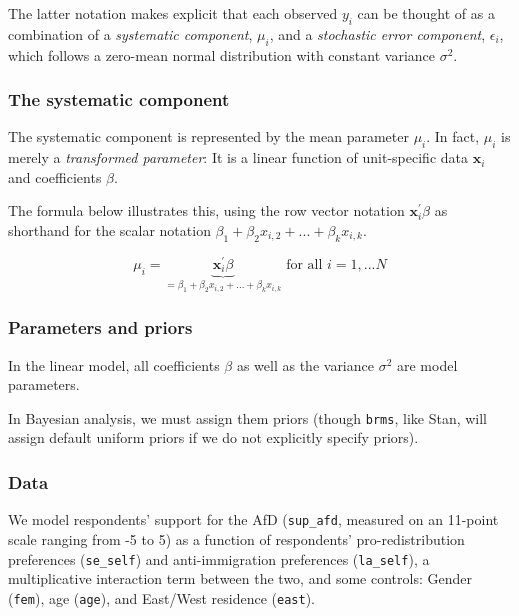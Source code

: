 \documentclass[
  11pt,
]{article}
\begin{document}
The latter notation makes explicit that each observed \(y_i\) can be thought of as a combination of a \emph{systematic component}, \(\mu_i\), and a \emph{stochastic error component}, \(\epsilon_i\), which follows a zero-mean normal distribution with constant variance \(\sigma^2\).

\hypertarget{the-systematic-component}{%
\subsubsection{The systematic component}\label{the-systematic-component}}

The systematic component is represented by the mean parameter \(\mu_i\). In fact, \(\mu_i\) is merely a \emph{transformed parameter}: It is a linear function of unit-specific data \(\mathbf{x}_i\) and coefficients \(\beta\).

The formula below illustrates this, using the row vector notation \(\mathbf{x}_i^{\prime} \beta\) as shorthand for the scalar notation \(\beta_1 + \beta_2 x_{i, 2} + ...+\beta_k x_{i,k}\).

\[\mu_i = \underbrace{\mathbf{x}_i^{\prime} \beta}_{= \beta_1 + \beta_2 x_{i, 2} + ...+\beta_k x_{i,k}}  \text{ for all }i = 1,...N\]

\hypertarget{parameters-and-priors}{%
\subsubsection{Parameters and priors}\label{parameters-and-priors}}

In the linear model, all coefficients \(\beta\) as well as the variance \(\sigma^2\) are model parameters.

In Bayesian analysis, we must assign them priors (though \texttt{brms}, like Stan, will assign default uniform priors if we do not explicitly specify priors).

\hypertarget{data}{%
\subsubsection{Data}\label{data}}

We model respondents' support for the AfD (\texttt{sup\_afd}, measured on an 11-point scale ranging from -5 to 5) as a function of respondents' pro-redistribution preferences (\texttt{se\_self}) and anti-immigration preferences (\texttt{la\_self}), a multiplicative interaction term between the two, and some controls: Gender (\texttt{fem}), age (\texttt{age}), and East/West residence (\texttt{east}).
\end{document}

